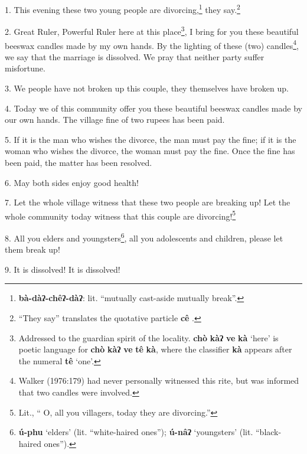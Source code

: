 \setcounter{footnote}{0}

1. This evening these two young people are divorcing,\footnote{\textbf{bà-dàʔ-chêʔ-dàʔ}: lit. ``mutually cast-aside mutually break''.} they say.\footnote{``They say'' translates the quotative particle \textbf{cê} .}

2. Great Ruler, Powerful Ruler here at this place\footnote{Addressed to the guardian spirit of the locality. \textbf{chò} \textbf{kàʔ} \textbf{ve} \textbf{kà} `here' is poetic language for \textbf{chò} \textbf{kàʔ} \textbf{ve} \textbf{tê} \textbf{kà}, where the classifier \textbf{kà} appears after the numeral \textbf{tê} `one'.}, I bring for you these beautiful
beeswax candles made by my own hands. By the lighting of these (two) candles\footnote{Walker (1976:179) had never personally witnessed this rite, but was informed that two candles were involved.},
we say that the marriage is dissolved. We pray that neither party suffer misfortune.

3. We people have not broken up this couple, they themselves have broken up.

4. Today we of this community offer you these beautiful beeswax candles made by
our own hands. The village fine of two rupees has been paid.

5. If it is the man who wishes the divorce, the man must pay the fine; if it is
the woman who wishes the divorce, the woman must pay the fine. Once the fine has
been paid, the matter has been resolved.

6. May both sides enjoy good health!

7. Let the whole village witness that these two people are breaking up! Let the
whole community today witness that this couple are divorcing!\footnote{Lit., `` O, all you villagers, today they are divorcing.''}

8. All you elders and youngsters\footnote{\textbf{ú-phu} `elders' (lit. ``white-haired ones''); \textbf{ú-nâʔ} `youngsters' (lit. ``black-haired ones'').}, all you adolescents and children, please
let them break up!

9. It is dissolved! It is dissolved!

